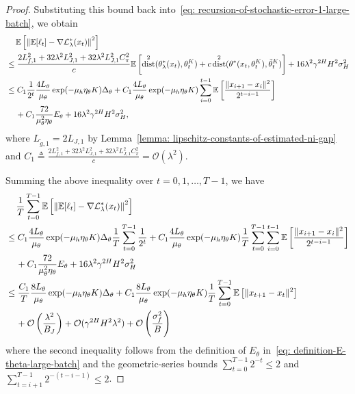 \documentclass{article}
\theoremstyle{plain}
\theoremstyle{definition}
\theoremstyle{remark}
\DeclareMathOperator{\dist}{dist}
\def\E{\mathbb E}
\def\cL{\mathcal L}
\def\cO{\mathcal O}
\def\bydef{\triangleq}
\begin{document}
\begin{proof}
    Substituting this bound back into~\eqref{eq: recursion-of-stochastic-error-1-large-batch}, we obtain
    \begin{align}
        & \quad \,  \E \left[ \left\| \E [\ell_t ] - \nabla \cL_\lambda^*(x_t) \right\|^2 \right] \notag \\
        & \leq \frac{2L_{f,1}^2 + 32 \lambda^2L_{J,1}^2 + 32 \lambda^2 L_{J,1}^2 C_\pi^2}{c} \E \left[  \dist^2 (\theta^*_\lambda(x_t), \theta_t^{K}) + c \dist^2 (\theta^*(x_t,\theta_t^K), \tilde{\theta}_t^K)  \right]+ 16 \lambda^2 \gamma^{2H} H^2 \sigma_H^2 \notag \\
        & \leq  C_1 \frac{1}{2^t} \frac{4L_{\theta}}{\mu_\theta} \exp ( - \mu_h \eta_\theta K )   \Delta_\theta + C_1 \frac{4 L_{\theta}}{\mu_\theta} \exp( - \mu_h \eta_\theta K ) \sum_{i=0}^{t-1} \E \left[ \frac{\|x_{i+1} - x_{i} \|^2}{2^{t-i-1}} \right]  \notag \\
        & \quad \, +  C_1 \frac{72}{\mu_\theta^2 \eta_\theta} E_\theta  + 16 \lambda^2 \gamma^{2H} H^2 \sigma_H^2 ,
    \end{align}
    where $L_{\widetilde{g},1} = 2L_{J,1}$ by Lemma~\ref{lemma: lipschitz-constants-of-estimated-ni-gap} and $C_1 \bydef \frac{2L_{f,1}^2 + 32 \lambda^2L_{J,1}^2 + 32 \lambda^2 L_{J,1}^2 C_\pi^2}{c} = \cO(\lambda^2)$.

    Summing the above inequality over $t=0,1,\ldots,T-1$, we have
    \begin{align}
        & \quad \, \frac{1}{T }\sum_{t=0}^{T-1} \E \left[ \left\| \E [\ell_t ] - \nabla \cL_\lambda^*(x_t) \right\|^2 \right] \notag \\
        & \leq C_1 \frac{4L_{\theta}}{\mu_\theta} \exp ( - \mu_h \eta_\theta K )   \Delta_\theta \frac{1}{T } \sum_{t=0}^{T-1} \frac{1}{2^t} + C_1 \frac{4 L_{\theta}}{\mu_\theta} \exp( - \mu_h \eta_\theta K ) \frac{1}{T } \sum_{t=0}^{T-1} \sum_{i=0}^{t-1} \E \left[ \frac{\|x_{i+1} - x_{i} \|^2}{2^{t-i-1}} \right]  \notag \\
        & \quad \, +  C_1\frac{72}{\mu_\theta^2 \eta_\theta} E_\theta + 16 \lambda^2 \gamma^{2H} H^2 \sigma_H^2 \\
        & \leq \frac{C_1}{T} \frac{8L_{\theta}}{\mu_\theta} \exp ( - \mu_h \eta_\theta K )   \Delta_\theta + C_1 \frac{8 L_{\theta}}{\mu_\theta} \exp( - \mu_h \eta_\theta K ) \frac{1}{T } \sum_{t=0}^{T-1} \E \left[ \|x_{t+1} - x_{t} \|^2 \right] \notag \\
        & \quad \, + \cO\left(\frac{\lambda^2}{B_J}\right) + \cO(\gamma^{2H} H^2 \lambda^2) + \cO\left(\frac{\sigma_f^2}{B}\right)   
    \end{align}
    where the second inequality follows from the definition of $E_\theta$ in~\eqref{eq: definition-E-theta-large-batch} and the geometric-series bounds 
    $\sum_{t=0}^{T-1}2^{-t}\le 2$ and 
    $\sum_{t=i+1}^{T-1}2^{-(t-i-1)}\le 2$.
\end{proof}
\end{document}
